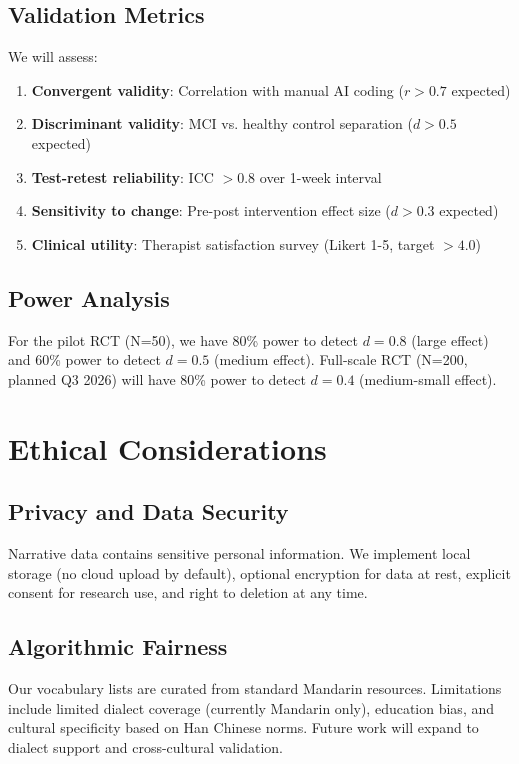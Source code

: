 \documentclass{article}
\begin{document}
\subsection{Validation Metrics}

We will assess:
\begin{enumerate}[label=(\arabic*)]
    \item \textbf{Convergent validity}: Correlation with manual AI coding ($r > 0.7$ expected)
    \item \textbf{Discriminant validity}: MCI vs. healthy control separation ($d > 0.5$ expected)
    \item \textbf{Test-retest reliability}: ICC $> 0.8$ over 1-week interval
    \item \textbf{Sensitivity to change}: Pre-post intervention effect size ($d > 0.3$ expected)
    \item \textbf{Clinical utility}: Therapist satisfaction survey (Likert 1-5, target $>4.0$)
\end{enumerate}

\subsection{Power Analysis}

For the pilot RCT (N=50), we have 80\% power to detect $d = 0.8$ (large effect) and 60\% power to detect $d = 0.5$ (medium effect). Full-scale RCT (N=200, planned Q3 2026) will have 80\% power to detect $d = 0.4$ (medium-small effect).

\section{Ethical Considerations}

\subsection{Privacy and Data Security}

Narrative data contains sensitive personal information. We implement local storage (no cloud upload by default), optional encryption for data at rest, explicit consent for research use, and right to deletion at any time.

\subsection{Algorithmic Fairness}

Our vocabulary lists are curated from standard Mandarin resources. Limitations include limited dialect coverage (currently Mandarin only), education bias, and cultural specificity based on Han Chinese norms. Future work will expand to dialect support and cross-cultural validation.
\end{document}
